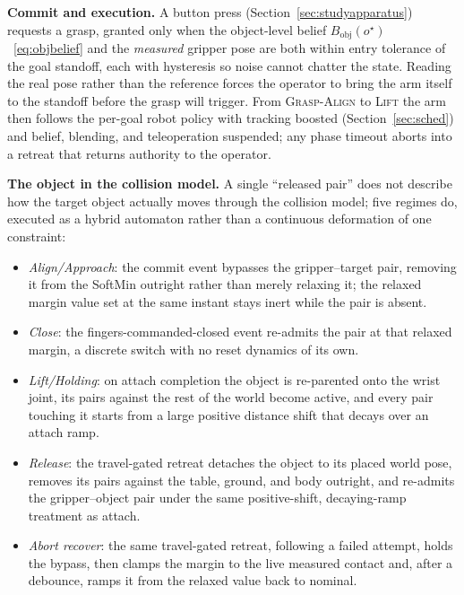 \documentclass[12pt,a4paper,twoside,openright]{report}
\begin{document}
\textbf{Commit and execution.} A button press (Section~\ref{sec:studyapparatus}) requests a grasp, granted only when the object-level belief $B_{\text{obj}}(o^{\star})$~\eqref{eq:objbelief} and the \emph{measured} gripper pose are both within entry tolerance of the goal standoff, each with hysteresis so noise cannot chatter the state. Reading the real pose rather than the reference forces the operator to bring the arm itself to the standoff before the grasp will trigger. From \textsc{Grasp-Align} to \textsc{Lift} the arm then follows the per-goal robot policy with tracking boosted (Section~\ref{sec:sched}) and belief, blending, and teleoperation suspended; any phase timeout aborts into a retreat that returns authority to the operator.

\textbf{The object in the collision model.} A single ``released pair'' does not describe how the target object actually moves through the collision model; five regimes do, executed as a hybrid automaton rather than a continuous deformation of one constraint:
\begin{itemize}[nosep]
\item \emph{Align/Approach}: the commit event bypasses the gripper--target pair, removing it from the SoftMin outright rather than merely relaxing it; the relaxed margin value set at the same instant stays inert while the pair is absent.
\item \emph{Close}: the fingers-commanded-closed event re-admits the pair at that relaxed margin, a discrete switch with no reset dynamics of its own.
\item \emph{Lift/Holding}: on attach completion the object is re-parented onto the wrist joint, its pairs against the rest of the world become active, and every pair touching it starts from a large positive distance shift that decays over an attach ramp.
\item \emph{Release}: the travel-gated retreat detaches the object to its placed world pose, removes its pairs against the table, ground, and body outright, and re-admits the gripper--object pair under the same positive-shift, decaying-ramp treatment as attach.
\item \emph{Abort recover}: the same travel-gated retreat, following a failed attempt, holds the bypass, then clamps the margin to the live measured contact and, after a debounce, ramps it from the relaxed value back to nominal.
\end{itemize}
\end{document}
